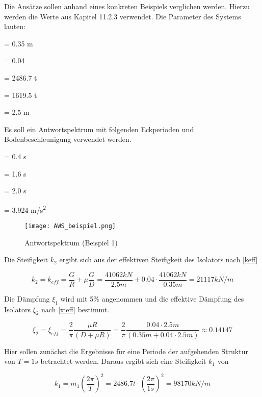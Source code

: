 Die Ansätze sollen anhand eines konkreten Beispiels verglichen werden. Hierzu werden die Werte aus \cite{Isemann} Kapitel 11.2.3 verwendet.
Die Parameter des Systems lauten:

    = 0.35 m \par
\makebox[1cm]{$\mu$}  = 0.04\par
{}  = 2486.7 t\par
{}  = 1619.5 t\par
{}    = 2.5 m\par

Es soll ein Antwortspektrum mit folgenden Eckperioden und Bodenbeschleunigung verwendet werden.

  = 0.4 s\par
{}  = 1.6 s\par
{}  = 2.0 s\par
{}  = 3.924 m/s\textsuperscript{2}\par

\begin{figure}[H]
    \centering
    \texttt{[image: AWS\_beispiel.png]}
    \caption{Antwortspektrum (Beispiel 1)}
\end{figure}

Die Steifigkeit $k_2$ ergibt sich aus der effektiven Steifigkeit des Isolators nach \cref{keff}

\begin{equation*}
k_2 = k_{eff} = \frac{G}{R} + \mu \frac{G}{D} = \frac{41062 kN}{2.5 m} + 0.04 \cdot \frac{41062 kN}{0.35 m} = 21117 kN/m
\end{equation*}

Die Dämpfung $\xi_1$ wird mit 5\% angenommen und die effektive Dämpfung des Isolators $\xi_2$ nach \cref{xieff} bestimmt.

\begin{equation*}
\xi_2 = \xi_{eff} = \frac{2}{\pi} \frac{\mu R}{(D + \mu R)} = \frac{2}{\pi} \frac{0.04 \cdot 2.5 m}{(0.35 m + 0.04 \cdot 2.5 m)} \approx 0.14147
\end{equation*}

Hier sollen zunächst die Ergebnisse für eine Periode der aufgehenden Struktur von $T = 1 s$ betrachtet werden. Daraus ergibt sich eine Steifigkeit $k_1$ von

\begin{equation*}
k_1 = m_1 (\frac{2 \pi}{T})^2 = 2486.7 t \cdot (\frac{2 \pi}{1 s})^2 = 98170 kN/m
\end{equation*}

